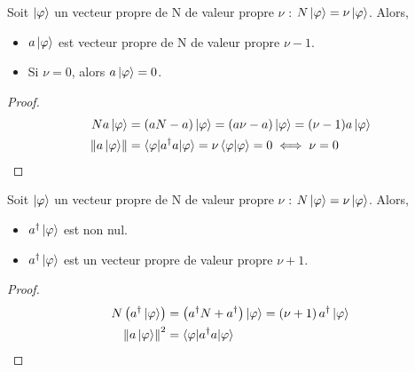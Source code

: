 \documentclass[../notesdecours.tex]{subfiles}
\begin{document}
\begin{Property}
    Soit $\ket{\varphi}$ un vecteur propre de N de valeur propre $\nu$ : $N\ket{\varphi} = \nu\ket{\varphi}$. Alors,
    \begin{itemize}
        \item $a\ket{\varphi}$ est vecteur propre de N de valeur propre $\nu-1$.
        \item Si $\nu = 0$, alors $a\ket{\varphi} = 0$.
    \end{itemize}
\end{Property}
\begin{proof}
    \begin{align*}
        N a\ket{\varphi} &= (aN-a)\ket{\varphi} = (a\nu-a)\ket{\varphi} = (\nu-1)a\ket{\varphi}\\
        \norm{a\ket{\varphi}} &= \braket{\varphi|a^\dagger a|\varphi} = \nu \braket{\varphi|\varphi} = 0 \iff \nu = 0
    \end{align*}
\end{proof}
\begin{Property}
    Soit $\ket{\varphi}$ un vecteur propre de N de valeur propre $\nu$ : $N\ket{\varphi} = \nu\ket{\varphi}$. Alors,
    \begin{itemize}
        \item $a^\dagger\ket{\varphi}$ est non nul.
        \item $a^\dagger\ket{\varphi}$ est un vecteur propre de valeur propre $\nu+1$.
    \end{itemize}
\end{Property}
\begin{proof}
    \begin{align*}
        N \left(a^\dagger \ket{\varphi}\right) &= \left(a^\dagger N + a^\dagger\right)\ket{\varphi} = \left(\nu+1\right)a^\dagger\ket{\varphi}\\
        \norm{a\ket{\varphi}}^2 &= \braket{\varphi|a^\dagger a|\varphi}
    \end{align*}
\end{proof}
\end{document}
